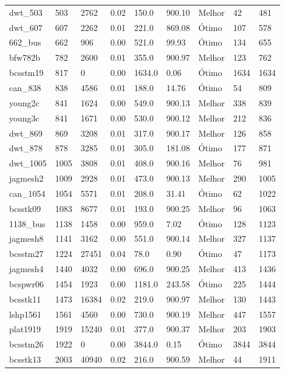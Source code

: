 \begin{table}[h!]
{\begin{tabular}{lllllllll}
			dwt\_503 & 503 & 2762 & 0.02 & 150.0 & 900.10 & Melhor & 42 & 481 \\
			dwt\_607 & 607 & 2262 & 0.01 & 221.0 & 869.08 & Ótimo & 107 & 578 \\
			662\_bus & 662 & 906 & 0.00 & 521.0 & 99.93 & Ótimo & 134 & 655 \\
			bfw782b & 782 & 2600 & 0.01 & 355.0 & 900.97 & Melhor & 123 & 762 \\
			bcsstm19 & 817 & 0 & 0.00 & 1634.0 & 0.06 & Ótimo & 1634 & 1634 \\
			can\_838 & 838 & 4586 & 0.01 & 188.0 & 14.76 & Ótimo & 54 & 809 \\
			young2c & 841 & 1624 & 0.00 & 549.0 & 900.13 & Melhor & 338 & 839 \\
			young3c & 841 & 1671 & 0.00 & 530.0 & 900.12 & Melhor & 212 & 836 \\
			dwt\_869 & 869 & 3208 & 0.01 & 317.0 & 900.17 & Melhor & 126 & 858 \\
			dwt\_878 & 878 & 3285 & 0.01 & 305.0 & 181.08 & Ótimo & 177 & 871 \\
			dwt\_1005 & 1005 & 3808 & 0.01 & 408.0 & 900.16 & Melhor & 76 & 981 \\
			jagmesh2 & 1009 & 2928 & 0.01 & 473.0 & 900.13 & Melhor & 290 & 1005 \\
			can\_1054 & 1054 & 5571 & 0.01 & 208.0 & 31.41 & Ótimo & 62 & 1022 \\
			bcsstk09 & 1083 & 8677 & 0.01 & 193.0 & 900.25 & Melhor & 96 & 1063 \\
			1138\_bus & 1138 & 1458 & 0.00 & 959.0 & 7.02 & Ótimo & 128 & 1123 \\
			jagmesh8 & 1141 & 3162 & 0.00 & 551.0 & 900.14 & Melhor & 327 & 1137 \\
			bcsstm27 & 1224 & 27451 & 0.04 & 78.0 & 0.90 & Ótimo & 47 & 1173 \\
			jagmesh4 & 1440 & 4032 & 0.00 & 696.0 & 900.25 & Melhor & 413 & 1436 \\
			bcspwr06 & 1454 & 1923 & 0.00 & 1181.0 & 243.58 & Ótimo & 225 & 1444 \\
			bcsstk11 & 1473 & 16384 & 0.02 & 219.0 & 900.97 & Melhor & 130 & 1443 \\
			lshp1561 & 1561 & 4560 & 0.00 & 730.0 & 900.19 & Melhor & 447 & 1557 \\
			plat1919 & 1919 & 15240 & 0.01 & 377.0 & 900.37 & Melhor & 203 & 1903 \\
			bcsstm26 & 1922 & 0 & 0.00 & 3844.0 & 0.15 & Ótimo & 3844 & 3844 \\
			bcsstk13 & 2003 & 40940 & 0.02 & 216.0 & 900.59 & Melhor & 44 & 1911 \\

\end{tabular}}
\end{table}
